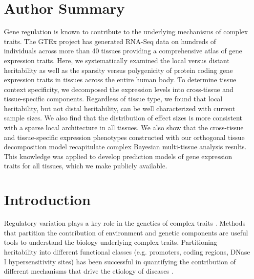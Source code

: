 \documentclass[10pt,letterpaper]{article}
\begin{document}
\section*{Author Summary} %
Gene regulation is known to contribute to the underlying mechanisms of complex traits. The GTEx project has generated RNA-Seq data on hundreds of individuals across more than 40 tissues providing a comprehensive atlas of gene expression traits. Here, we systematically examined the local versus distant heritability as well as the sparsity versus polygenicity of protein coding gene expression traits in tissues across the entire human body. To determine tissue context specificity, we decomposed the expression levels into cross-tissue and tissue-specific components. Regardless of tissue type, we found that local heritability, but not distal heritability, can be well characterized with current sample sizes. We also find that the distribution of effect sizes is more consistent with a sparse local architecture in all tissues. We also show that the cross-tissue and tissue-specific expression phenotypes constructed with our orthogonal tissue decomposition model recapitulate complex Bayesian multi-tissue analysis results. This knowledge was applied to develop prediction models of gene expression traits for all tissues, which we make publicly available.

\linenumbers


\section*{Introduction}
Regulatory variation plays a key role in the genetics of complex traits \cite{Nicolae_2010, Nica_2010, Gusev_2014}. Methods that partition the contribution of environment and genetic components are useful tools to understand the biology underlying complex traits. Partitioning heritability into different functional classes (e.g. promoters, coding regions, DNase I hypersensitivity sites) has been successful in quantifying the contribution of different mechanisms that drive the etiology of diseases \cite{Gusev_2014,torres2014cross,davis2013partitioning}.
\end{document}
